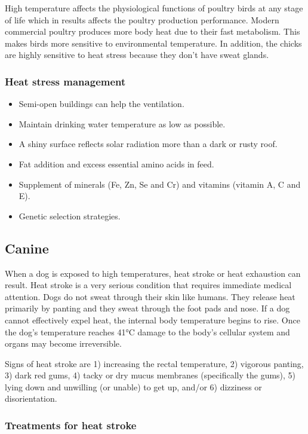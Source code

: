 \documentclass[]{book}
\providecommand{\tightlist}{%
  \setlength{\itemsep}{0pt}\setlength{\parskip}{0pt}}
\begin{document}
High temperature affects the physiological functions of poultry birds at
any stage of life which in results affects the poultry production
performance. Modern commercial poultry produces more body heat due to
their fast metabolism. This makes birds more sensitive to environmental
temperature. In addition, the chicks are highly sensitive to heat stress
because they don't have sweat glands.

\subsubsection{Heat stress management}\label{heat-stress-management-2}

\begin{itemize}
\tightlist
\item
  Semi-open buildings can help the ventilation.
\item
  Maintain drinking water temperature as low as possible.
\item
  A shiny surface reflects solar radiation more than a dark or rusty
  roof.
\item
  Fat addition and excess essential amino acids in feed.
\item
  Supplement of minerals (Fe, Zn, Se and Cr) and vitamins (vitamin A, C
  and E).
\item
  Genetic selection strategies.
\end{itemize}

\subsection{Canine}\label{canine}

When a dog is exposed to high temperatures, heat stroke or heat
exhaustion can result. Heat stroke is a very serious condition that
requires immediate medical attention. Dogs do not sweat through their
skin like humans. They release heat primarily by panting and they sweat
through the foot pads and nose. If a dog cannot effectively expel heat,
the internal body temperature begins to rise. Once the dog's temperature
reaches 41°C damage to the body's cellular system and organs may become
irreversible.

Signs of heat stroke are 1) increasing the rectal temperature, 2)
vigorous panting, 3) dark red gums, 4) tacky or dry mucus membranes
(specifically the gums), 5) lying down and unwilling (or unable) to get
up, and/or 6) dizziness or disorientation.

\subsubsection{Treatments for heat
stroke}\label{treatments-for-heat-stroke}
\end{document}
